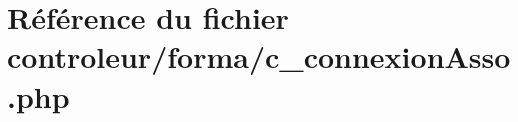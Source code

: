 \hypertarget{c__connexion_asso_8php}{}\section{Référence du fichier controleur/forma/c\+\_\+connexion\+Asso.php}
\label{c__connexion_asso_8php}
